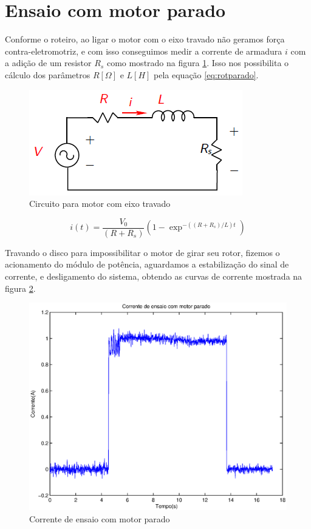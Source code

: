 \documentclass{article}
\begin{document}
\section{Ensaio com motor parado}
Conforme o roteiro\cite{bb:roteiro}, ao ligar o motor com o eixo travado não geramos força contra-eletromotriz, e com isso conseguimos medir a corrente de armadura $i$ com a adição de um resistor $R_s$ como mostrado na figura \ref{fig:rotparado}. Isso nos possibilita o cálculo dos parâmetros $R [\Omega]$ e $L [H]$ pela equação \ref{eq:rotparado}.

\begin{figure}[H]
	\centering
	\includegraphics[width=0.8\linewidth]{rotparado}
	\caption{Circuito para motor com eixo travado}
	\label{fig:rotparado}
\end{figure}

\begin{equation}
\label{eq:rotparado}
i(t) = \frac{V_0}{(R+R_s)}(1-\exp^{-((R+R_s)/L)t})
\end{equation}

Travando o disco para impossibilitar o motor de girar seu rotor, fizemos o acionamento do módulo de potência, aguardamos a estabilização do sinal de corrente, e desligamento do sistema, obtendo as curvas de corrente mostrada na figura \ref{fig:ensaiop}.

\begin{figure}[H]
	\centering
	\includegraphics[width=0.8\linewidth]{../ensaiop}
	\caption{Corrente de ensaio com motor parado}
	\label{fig:ensaiop}
\end{figure}
\end{document}
